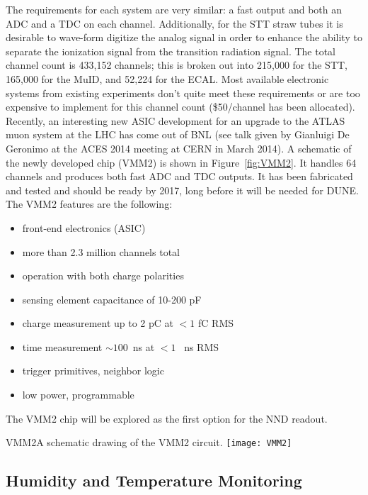 The requirements for each system are very similar: a fast output and both an ADC %
and a TDC on each channel.  %
Additionally, for the STT straw tubes it 
is desirable to wave-form digitize the analog signal in order to enhance the ability to separate 
the ionization signal from the transition radiation signal.  
The total channel count is 433,152 channels; this is broken out into 215,000 for the  STT, 165,000 for the
 MuID, and 52,224 for the ECAL. Most available electronic systems from 
existing experiments don't quite meet these requirements or are too expensive to implement 
for this channel count (\$50/channel has been allocated).  Recently, %
an interesting new ASIC development for an upgrade to the ATLAS muon system at the LHC %
has come out of BNL (see talk given by Gianluigi De Geronimo at the ACES 2014 meeting at
CERN in March 2014). %
A schematic of the newly developed chip (VMM2) is shown in 
Figure~\ref{fig:VMM2}.  It handles 64 channels and produces both fast ADC and TDC outputs.
It has been fabricated and tested and should be ready by 2017, long before it will be needed for DUNE. %
The VMM2 features are the following:
\begin{itemize}
\item front-end electronics (ASIC)
\item more than 2.3 million channels total
\item operation with both charge polarities
\item sensing element capacitance of 10-200 pF
\item charge measurement up to 2 pC at $< 1$ fC RMS
\item time measurement $\sim100$~ns at $< 1$ ~ns RMS
\item trigger primitives, neighbor logic
\item low power, programmable
\end{itemize}
The VMM2 chip will be explored  as the first option for the NND readout.  


\begin{cdrfigure}{VMM2}{A schematic drawing of the VMM2 circuit.}
\texttt{[image: VMM2]}
\end{cdrfigure}


\subsection{Humidity and Temperature Monitoring } %

